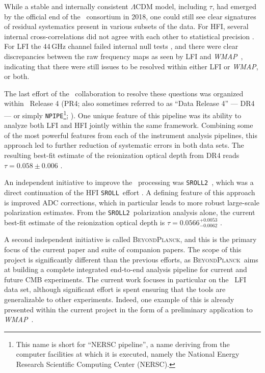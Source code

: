 \documentclass[onecolumn]{aa}
\def\WMAP{\emph{WMAP}}
\newcommand{\BP}{\textsc{BeyondPlanck}}
\newcommand{\npipe}[0]{\texttt{NPIPE}}
\newcommand{\sroll}[0]{\texttt{SROLL}}
\newcommand{\srollTwo}[0]{\texttt{SROLL2}}
\begin{document}
While a stable and internally consistent $\Lambda$CDM model, including
$\tau$, had emerged by the official end of the \Planck\ consortium in
2018, one could still see clear signatures of residual systematics
present in various subsets of the data. For HFI, several internal
cross-correlations did not agree with each other to statistical
precision \citep{planck2016-l03}. For LFI the 44\,GHz channel failed
internal null tests \citep{planck2016-l02}, and there were clear
discrepancies between the raw frequency maps as seen by LFI and
\WMAP\ \citep{planck2016-l04}, indicating that there were still issues
to be resolved within either LFI or \WMAP, or both.

The last effort of the \Planck\ collaboration to resolve these
questions was organized within \Planck\ Release 4 (PR4; also sometimes referred to as ``Data Release 4'' --- DR4 --- or simply \npipe\footnote{This name is short for ``NERSC
  pipeline'', a name deriving from the computer facilities at which it
  is executed, namely the National Energy Research Scientific
  Computing Center (NERSC).}; \citealp{planck2020-LVII}). One
unique feature of this pipeline was its ability to analyze both LFI
and HFI jointly within the same framework. Combining some of the most
powerful features from each of the instrument analysis pipelines, this
approach led to further reduction of systematic errors in both data
sets. The resulting best-fit estimate of the reionization optical
depth from DR4 reads $\tau=0.058\pm0.006$ \citep{tristram:2020}.

An independent initiative to improve the \Planck\ processing was
\srollTwo\ \citep{delouis:2019}, which was a direct continuation of the
HFI \sroll\ effort \citep{planck2016-l03}. A defining feature of this
approach is improved ADC corrections, which in particular leads to
more robust large-scale polarization estimates. From the
\srollTwo\ polarization analysis alone, the current best-fit estimate
of the reionization optical depth is $\tau=0.0566^{+0.0053}_{-0.0062}$
\citep{pagano:2020}.

A second independent initiative is called \BP, and this is the primary
focus of the current paper and suite of companion papers. The scope of
this project is significantly different than the previous efforts, as
\BP\ aims at building a complete integrated end-to-end analysis
pipeline for current and future CMB experiments. The current work
focuses in particular on the \Planck\ LFI data set, although
significant effort is spent ensuring that the tools are generalizable
to other experiments. Indeed, one example of this is already presented
within the current project in the form of a preliminary application to
\WMAP\ \citep{bennett2012,bp17}.
\end{document}
